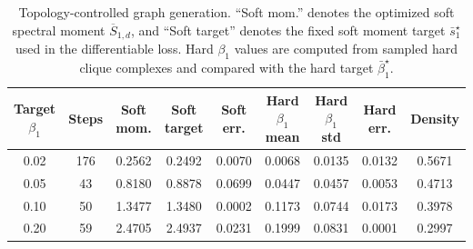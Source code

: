 \documentclass[pdflatex,sn-mathphys-ay]{sn-jnl}%
\theoremstyle{thmstyleone}%
\theoremstyle{thmstyletwo}%
\theoremstyle{thmstylethree}%
\begin{document}

\begin{table}[t]
    \centering
    \caption{Topology-controlled graph generation. ``Soft mom.'' denotes the optimized soft spectral moment \(\overline{S}_{1,d}\), and ``Soft target'' denotes the fixed soft moment target \(\bar{s}_1^\star\) used in the differentiable loss. Hard \(\beta_1\) values are computed from sampled hard clique complexes and compared with the hard target \(\bar{\beta}_1^\star\).}
    \label{tab:topology_control}
    \scriptsize
    \begin{tabular}{c|c|c|c|c|c|c|c|c}
        \hline
        Target $\beta_1$ & Steps & Soft mom. & Soft target & Soft err.
        & Hard $\beta_1$ mean & Hard $\beta_1$ std
        & Hard err. & Density \\
        \hline
        0.02 & 176 & 0.2562 & 0.2492 & 0.0070 & 0.0068 & 0.0135 & 0.0132 & 0.5671 \\
        0.05 & 43  & 0.8180 & 0.8878 & 0.0699 & 0.0447 & 0.0457 & 0.0053 & 0.4713 \\
        0.10 & 50  & 1.3477 & 1.3480 & 0.0002 & 0.1173 & 0.0744 & 0.0173 & 0.3978 \\
        0.20 & 59  & 2.4705 & 2.4937 & 0.0231 & 0.1999 & 0.0831 & 0.0001 & 0.2997 \\
        \hline
    \end{tabular}
\end{table}
\end{document}
